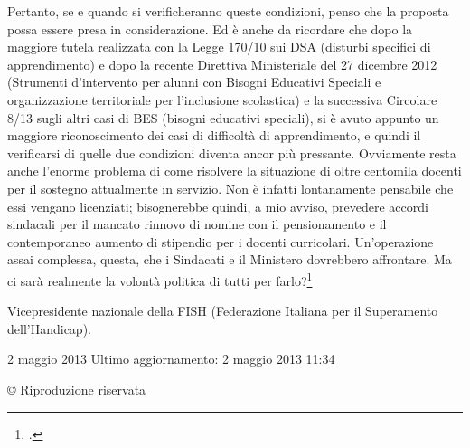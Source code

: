 Pertanto, se e quando si verificheranno queste condizioni, penso che la proposta possa essere presa in considerazione. Ed è anche da ricordare che dopo la maggiore tutela realizzata con la Legge 170/10 sui DSA (disturbi specifici di apprendimento) e dopo la recente Direttiva Ministeriale del 27 dicembre 2012 (Strumenti d'intervento per alunni con Bisogni Educativi Speciali e organizzazione territoriale per l'inclusione scolastica) e la successiva Circolare 8/13 sugli altri casi di BES (bisogni educativi speciali), si è avuto appunto un maggiore riconoscimento dei casi di difficoltà di apprendimento, e quindi il verificarsi di quelle due condizioni diventa ancor più pressante.
Ovviamente resta anche l'enorme problema di come risolvere la situazione di oltre centomila docenti per il sostegno attualmente in servizio. Non è infatti lontanamente pensabile che essi vengano licenziati; bisognerebbe quindi, a mio avviso, prevedere accordi sindacali per il mancato rinnovo di nomine con il pensionamento e il contemporaneo aumento di stipendio per i docenti curricolari. Un'operazione assai complessa, questa, che i Sindacati e il Ministero dovrebbero affrontare. Ma ci sarà realmente la volontà politica di tutti per farlo?\footcite{nocera5}

Vicepresidente nazionale della FISH (Federazione Italiana per il Superamento dell'Handicap).

2 maggio 2013
Ultimo aggiornamento: 2 maggio 2013 11:34

© Riproduzione riservata